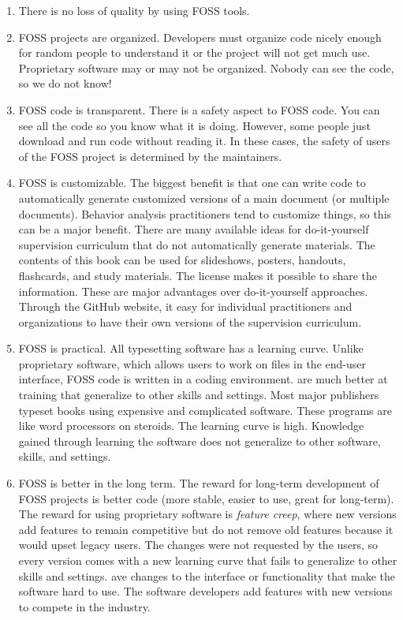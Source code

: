 \begin{enumerate}
\item There is no loss of quality by using FOSS tools. 

\item FOSS projects are organized. Developers must organize code nicely enough for random people to understand it or the project will not get much use. Proprietary software may or may not be organized. Nobody can see the code, so we do not know!

\item FOSS code is transparent. There is a safety aspect to FOSS code. You can see all the code so you know what it is doing. However, some people just download and run code without reading it. In these cases, the safety of users of the FOSS project is determined by the maintainers.
 
\item FOSS is customizable. The biggest benefit is that one can write code to automatically generate customized versions of a main document (or multiple documents). Behavior analysis practitioners tend to customize things, so this can be a major benefit. There are many available ideas for do-it-yourself supervision curriculum that do not automatically generate materials. The contents of this book can be used for slideshows, posters, handouts, flashcards, and study materials. The license makes it possible to share the information. These are major advantages over do-it-yourself approaches. Through the GitHub website, it easy for individual practitioners and organizations to have their own versions of the supervision curriculum. 

\item FOSS is practical. All typesetting software has a learning curve. Unlike proprietary software, which allows users to work on files in the end-user interface, FOSS code is written in a coding environment.  are much better at training  that generalize to other skills and settings. Most major publishers typeset books using expensive and complicated software. These programs are like word processors on steroids. The learning curve is high. Knowledge gained through learning the software does not generalize to other software, skills, and settings. 

\item FOSS is better in the long term. The reward for long-term development of FOSS projects is better code (more stable, easier to use, great for long-term). The reward for using proprietary software is \textit{feature creep}, where new versions add features to remain competitive but do not remove old features because it would upset legacy users. The changes were not requested by the users, so every version comes with a new learning curve that fails to generalize to other skills and settings. ave changes to the interface or functionality that make the software hard to use. The software developers add features with new versions to compete in the industry. 

\end{enumerate}

